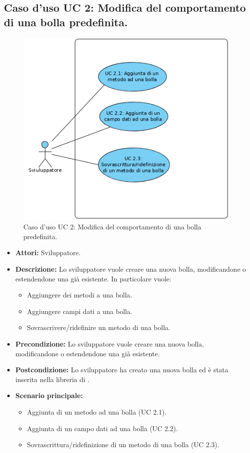 \subsection{Caso d'uso UC 2: Modifica del comportamento di una bolla predefinita.}
\label{Caso d'uso UC 2: Modifica del comportamento di una bolla predefinita.}
\begin{figure}[ht]
	\centering
	\includegraphics[scale=0.60]{Usecases/img/UC2.png}
	\caption{Caso d'uso UC 2: Modifica del comportamento di una bolla predefinita.}
\end{figure}

\FloatBarrier
\begin{itemize}
\item \textbf{Attori:} Sviluppatore.
\item \textbf{Descrizione:} Lo sviluppatore vuole creare una nuova bolla, modificandone o estendendone una già esistente. In particolare vuole:
	\begin{itemize}
	\item{Aggiungere dei metodi a una bolla.}
	\item{Aggiungere campi dati a una bolla.}
	\item{Sovrascrivere/ridefinire un metodo di una bolla.}
	\end{itemize}
\item \textbf{Precondizione:} Lo sviluppatore vuole creare una nuova bolla, modificandone o estendendone una già esistente. 
\item \textbf{Postcondizione:} Lo sviluppatore ha creato una nuova bolla ed è stata inserita nella libreria di \progetto.
\item \textbf{Scenario principale:}
	\begin{itemize}
	\item{Aggiunta di un metodo ad una bolla (UC 2.1).} 
	\item{Aggiunta di un campo dati ad una bolla (UC 2.2).}
	\item{Sovrascrittura/ridefinizione di un metodo di una bolla (UC 2.3).}
	\end{itemize}
\end{itemize}